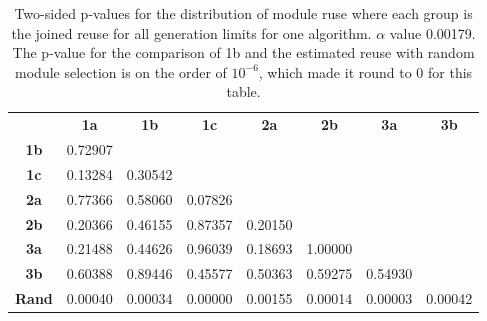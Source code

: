 \begin{table}[h!]
    \centering
    \begin{tabular}{cccccccc}
                  & \textbf{1a}  & \textbf{1b}  & \textbf{1c}  & \textbf{2a}  & \textbf{2b}  & \textbf{3a}  & \textbf{3b}  \\
    \textbf{1b}   & 0.72907 &         &         &         &         &         &              \\
    \textbf{1c}   & 0.13284 & 0.30542 &         &         &         &         &              \\
    \textbf{2a}   & 0.77366 & 0.58060 & 0.07826 &         &         &         &              \\
    \textbf{2b}   & 0.20366 & 0.46155 & 0.87357 & 0.20150 &         &         &              \\
    \textbf{3a}   & 0.21488 & 0.44626 & 0.96039 & 0.18693 & 1.00000 &         &              \\
    \textbf{3b}   & 0.60388 & 0.89446 & 0.45577 & 0.50363 & 0.59275 & 0.54930 &              \\
    \textbf{Rand} & 0.00040 & 0.00034 & 0.00000 & 0.00155 & 0.00014 & 0.00003 & 0.00042
    \end{tabular}
    \caption[Experiment 3: p-table for reuse]{Two-sided p-values for the distribution of module ruse where each group is the joined reuse for all generation limits for one algorithm. \(\alpha\) value 0.00179. The p-value for the comparison of 1b and the estimated reuse with random module selection is on the order of \(10^{-6}\), which made it round to 0 for this table.}
    \label{tab:exp3.reuseptable}
\end{table}
